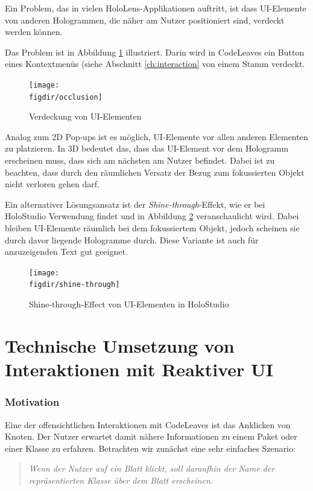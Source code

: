 Ein Problem, das in vielen HoloLens-Applikationen auftritt, ist dass UI-Elemente von anderen Hologrammen, die näher am Nutzer positioniert sind, verdeckt werden können.

Das Problem ist in Abbildung \ref{fig:occlusion} illustriert. Darin wird in CodeLeaves ein Button eines Kontextmenüs (siehe Abschnitt \ref{ch:interaction} von einem Stamm verdeckt.

\begin{figure}[htb]
  \texttt{[image: \\figdir/occlusion]}
  \caption{Verdeckung von UI-Elementen}
  \label{fig:occlusion}
\end{figure}

Analog zum 2D Pop-ups ist es möglich, UI-Elemente vor allen anderen Elementen zu platzieren. In 3D bedeutet das, dass das UI-Element vor dem Hologramm erscheinen muss, dass sich am nächsten am Nutzer befindet. Dabei ist zu beachten, dass durch den räumlichen Versatz der Bezug zum fokussierten Objekt nicht verloren gehen darf.

Ein alternativer Lösungsansatz ist der \textit{Shine-through}-Effekt, wie er bei HoloStudio Verwendung findet und in Abbildung \ref{fig:shine-through} veranschaulicht wird. Dabei bleiben UI-Elemente räumlich bei dem fokussiertem Objekt, jedoch scheinen sie durch davor liegende Hologramme durch. Diese Variante ist auch für anzuzeigenden Text gut geeignet.

\begin{figure}[htb]
  \texttt{[image: \\figdir/shine-through]}
  \caption{Shine-through-Effect von UI-Elementen in HoloStudio \cite{windows2017casestudy3}}
  \label{fig:shine-through}
\end{figure}

\section{Technische Umsetzung von Interaktionen mit Reaktiver UI}

\subsubsection*{Motivation}
Eine der offensichtlichen Interaktionen mit CodeLeaves ist das Anklicken von Knoten. Der Nutzer erwartet damit nähere Informationen zu einem Paket oder einer Klasse zu erfahren. Betrachten wir zunächst eine sehr einfaches Szenario:

\begin{quotation}
  \textit{Wenn der Nutzer auf ein Blatt klickt, soll daraufhin der Name der repräsentierten Klasse über dem Blatt erscheinen.}
\end{quotation}


